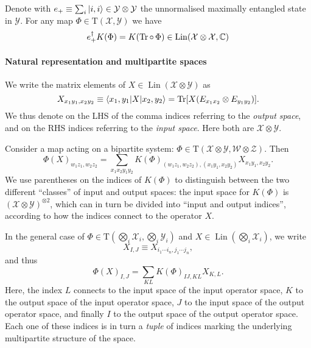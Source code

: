 \documentclass[12pt]{report}
\newcommand{\CC}{\mathbb{C}}
\newcommand{\calY}{{\mathcal{Y}}}
\newcommand{\calW}{{\mathcal{W}}}
\newcommand{\calX}{{\mathcal{X}}}
\newcommand{\calZ}{{\mathcal{Z}}}
\newcommand{\rmT}{{\mathrm{T}}}
\DeclareMathOperator{\Lin}{Lin}
\begin{document}
\begin{prop}
	Denote with $e_+\equiv \sum_i \ket{i,i}\in\calY\otimes\calY$ the unnormalised maximally entangled state in $\calY$.
	For any map $\Phi\in\rmT(\calX,\calY)$ we have
	\begin{equation}
		e_+^\dagger K(\Phi) = K(\Tr\circ\, \Phi) \in \Lin(\calX\otimes\calX,\CC)
	\end{equation}
\end{prop}

\paragraph{Natural representation and multipartite spaces}
We write the matrix elements of $X\in\Lin(\calX\otimes\calY)$ as
\begin{equation}
	X_{x_1 y_1,x_2 y_2}
	\equiv \langle x_1, y_1 | X | x_2, y_2\rangle
	= \Tr[X (E_{x_1 x_2} \otimes E_{y_1 y_2})].
\end{equation}
We thus denote on the LHS of the comma indices referring to the \emph{output space}, and on the RHS indices referring to the \emph{input space}. Here both are $\calX\otimes\calY$.

Consider a map acting on a bipartite system: $\Phi\in\rmT(\calX\otimes\calY,\calW\otimes\calZ)$. Then
\begin{equation}
	\Phi(X)_{w_1 z_1, w_2 z_2}
	= \sum_{x_1 x_2 y_1 y_2}
	K(\Phi)_{(w_1 z_1, w_2 z_2),(x_1 y_1, x_2 y_2)}
	X_{x_1 y_1,x_2 y_2}.
\end{equation}
We use parentheses on the indices of $K(\Phi)$ to distinguish between the two different ``classes'' of input and output spaces: the input space for $K(\Phi)$ is $(\calX\otimes\calY)^{\otimes 2}$, which can in turn be divided into ``input and output indices'', according to how the indices connect to the operator $X$.

In the general case of $\Phi\in\rmT(\bigotimes_i \calX_i,\bigotimes_i \calY_i)$ and $X\in\Lin(\bigotimes_i \calX_i)$, we write
\begin{equation}
	X_{I,J} \equiv X_{i_1\cdots i_n, j_1\cdots j_n},
\end{equation}
and thus
\begin{equation}
	\Phi(X)_{I,J}
	= \sum_{KL} K(\Phi)_{IJ,KL} X_{K,L}.
\end{equation}
Here, the index $L$ connects to the input space of the input operator space, $K$ to the output space of the input operator space, $J$ to the input space of the output operator space, and finally $I$ to the output space of the output operator space.
Each one of these indices is in turn a \emph{tuple} of indices marking the underlying multipartite structure of the space.
\end{document}
